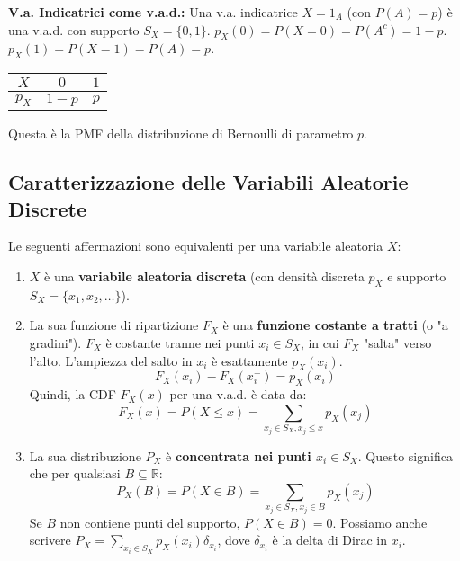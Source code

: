 \textbf{V.a. Indicatrici come v.a.d.:}
Una v.a. indicatrice $X=1_A$ (con $P(A)=p$) è una v.a.d. con supporto $S_X=\{0,1\}$.
$p_X(0) = P(X=0) = P(A^c) = 1-p$.
$p_X(1) = P(X=1) = P(A) = p$.
\begin{center}
\begin{tabular}{c|cc}
$X$ & $0$ & $1$ \\
\hline
$p_X$ & $1-p$ & $p$ \\
\end{tabular}
\end{center}
Questa è la PMF della distribuzione di Bernoulli di parametro $p$.

\subsection{Caratterizzazione delle Variabili Aleatorie Discrete}
Le seguenti affermazioni sono equivalenti per una variabile aleatoria $X$:
\begin{enumerate}
    \item $X$ è una \textbf{variabile aleatoria discreta} (con densità discreta $p_X$ e supporto $S_X = \{x_1, x_2, \dots\}$).
    \item La sua funzione di ripartizione $F_X$ è una \textbf{funzione costante a tratti} (o "a gradini"). $F_X$ è costante tranne nei punti $x_i \in S_X$, in cui $F_X$ "salta" verso l'alto. L'ampiezza del salto in $x_i$ è esattamente $p_X(x_i)$.
    \[ F_X(x_i) - F_X(x_i^-) = p_X(x_i) \]
    Quindi, la CDF $F_X(x)$ per una v.a.d. è data da:
    \[ F_X(x) = P(X \le x) = \sum_{x_j \in S_X, x_j \le x} p_X(x_j) \]
    \item La sua distribuzione $P_X$ è \textbf{concentrata nei punti $x_i \in S_X$}. Questo significa che per qualsiasi $B \subseteq \mathbb{R}$:
    \[ P_X(B) = P(X \in B) = \sum_{x_j \in S_X, x_j \in B} p_X(x_j) \]
    Se $B$ non contiene punti del supporto, $P(X \in B) = 0$.
    Possiamo anche scrivere $P_X = \sum_{x_i \in S_X} p_X(x_i) \delta_{x_i}$, dove $\delta_{x_i}$ è la delta di Dirac in $x_i$.
\end{enumerate}

